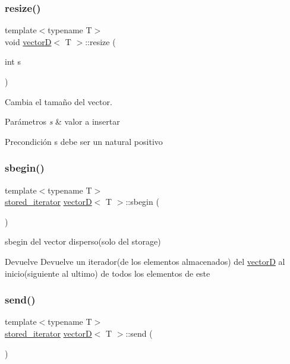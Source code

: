 \subsubsection{\texorpdfstring{resize()}{resize()}}
{\footnotesize\ttfamily template$<$typename T$>$ \\
void \hyperlink{classvectorD}{vectorD}$<$ T $>$\+::resize (\begin{DoxyParamCaption}\item[{int}]{s }\end{DoxyParamCaption})}



Cambia el tamaño del vector. 


\begin{DoxyParams}{Parámetros}
{\em s} & valor a insertar \\
\hline
\end{DoxyParams}
\begin{DoxyPrecond}{Precondición}
s debe ser un natural positivo 
\end{DoxyPrecond}
\mbox{\label{classvectorD_a92badd6d91c22212a46e4b3e8a264935}} 
\subsubsection{\texorpdfstring{sbegin()}{sbegin()}}
{\footnotesize\ttfamily template$<$typename T$>$ \\
\hyperlink{classvectorD_1_1stored__iterator}{stored\+\_\+iterator} \hyperlink{classvectorD}{vectorD}$<$ T $>$\+::sbegin (\begin{DoxyParamCaption}{ }\end{DoxyParamCaption})}



sbegin del vector disperso(solo del storage) 

\begin{DoxyReturn}{Devuelve}
Devuelve un iterador(de los elementos almacenados) del \hyperlink{classvectorD}{vectorD} al inicio(siguiente al ultimo) de todos los elementos de este 
\end{DoxyReturn}
\mbox{\label{classvectorD_a946a442ec127077eca2c03e06c418109}} 
\subsubsection{\texorpdfstring{send()}{send()}}
{\footnotesize\ttfamily template$<$typename T$>$ \\
\hyperlink{classvectorD_1_1stored__iterator}{stored\+\_\+iterator} \hyperlink{classvectorD}{vectorD}$<$ T $>$\+::send (\begin{DoxyParamCaption}{ }\end{DoxyParamCaption})}



